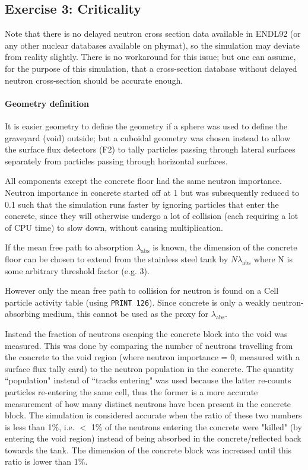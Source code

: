 \documentclass[a4paper, 12pt]{article}
\begin{document}
\subsection{Exercise 3: Criticality}
Note that there is no delayed neutron cross section data available in ENDL92 (or any other nuclear databases available on phymat), so the simulation may deviate from reality slightly. There is no workaround for this issue; but one can assume, for the purpose of this simulation, that a cross-section database without delayed neutron cross-section should be accurate enough.
\paragraph{Geometry definition} It is easier geometry to define the geometry if a sphere was used to define the graveyard (void) outside; but a cuboidal geometry was chosen instead to allow the surface flux detectors (F2) to tally particles passing through lateral surfaces separately from particles passing through horizontal surfaces.

All components except the concrete floor had the same neutron importance. Neutron importance in concrete started off at 1 but was subsequently reduced to 0.1 such that the simulation runs faster by ignoring particles that enter the concrete, since they will otherwise undergo a lot of collision (each requiring a lot of CPU time) to slow down, without causing multiplication.

If the mean free path to absorption $\lambda_{\text{abs}}$ is known, the dimension of the concrete floor can be chosen to extend from the stainless steel tank by $N\lambda_{\text{abs}}$ where N is some arbitrary threshold factor (e.g. 3).

However only the mean free path to collision for neutron is found on a Cell particle activity table (using \texttt{PRINT 126}). Since concrete is only a weakly neutron-absorbing medium, this cannot be used as the proxy for $\lambda_{\text{abs}}$.

Instead the fraction of neutrons escaping the concrete block into the void was measured. This was done by comparing the number of neutrons travelling from the concrete to the void region (where neutron importance = 0, measured with a surface flux tally card) to the neutron population in the concrete. The quantity ``population" instead of ``tracks entering" was used because the latter re-counts particles re-entering the same cell, thus the former is a more accurate measurement of how many distinct neutrons have been present in the concrete block. The simulation is considered accurate when the ratio of these two numbers is less than 1\%, i.e. $<$ 1\% of the neutrons entering the concrete were "killed" (by entering the void region) instead of being absorbed in the concrete/reflected back towards the tank. The dimension of the concrete block was increased until this ratio is lower than 1\%.
\end{document}
